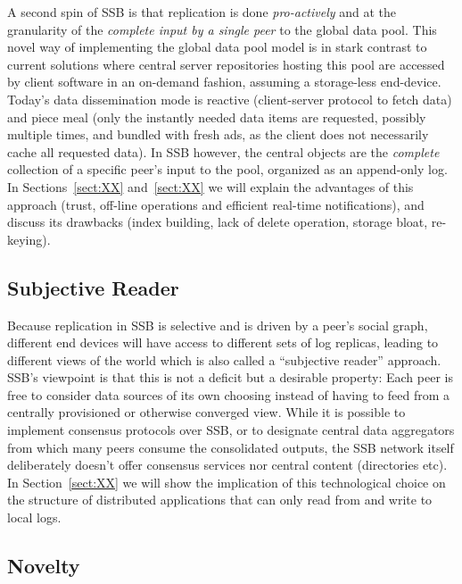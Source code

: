 \documentclass[10pt,sigconf]{acmart}
\begin{document}
A second spin of SSB is that replication is done {\em pro-actively} and
at the granularity of the {\em complete input by a single peer} to the
global data pool. This novel way of implementing the global data pool
model is in stark contrast to current solutions where central server
repositories hosting this pool are accessed by client software in an
on-demand fashion, assuming a storage-less end-device. Today's data
dissemination mode is reactive (client-server protocol to fetch data)
and piece meal (only the instantly needed data items are requested,
possibly multiple times, and bundled with fresh ads, as the client
does not necessarily cache all requested data). In SSB however, the
central objects are the {\em complete} collection of a specific peer's
input to the pool, organized as an append-only log. In
Sections~\ref{sect:XX} and~\ref{sect:XX} we will explain the
advantages of this approach (trust, off-line operations and efficient
real-time notifications), and discuss its drawbacks (index building,
lack of delete operation, storage bloat, re-keying).

\subsection*{Subjective Reader}

Because replication in SSB is selective and is driven by a peer's
social graph, different end devices will have access to different sets
of log replicas, leading to different views of the world which is also
called a ``subjective reader'' approach. SSB's viewpoint is that this
is not a deficit but a desirable property: Each peer is free to
consider data sources of its own choosing instead of having to feed
from a centrally provisioned or otherwise converged view. While it is
possible to implement consensus protocols over SSB, or to designate
central data aggregators from which many peers consume the
consolidated outputs, the SSB network itself deliberately doesn't
offer consensus services nor central content (directories etc). In
Section~\ref{sect:XX} we will show the implication of this
technological choice on the structure of distributed applications that
can only read from and write to local logs.

\subsection*{Novelty}
\end{document}
